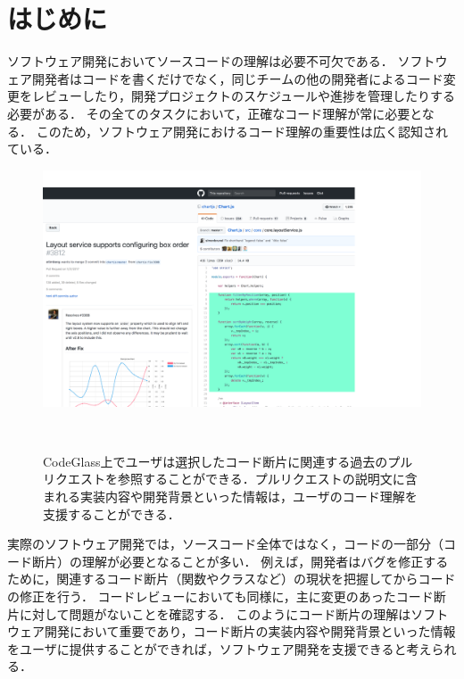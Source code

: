 \section{はじめに}



ソフトウェア開発においてソースコードの理解は必要不可欠である．
ソフトウェア開発者はコードを書くだけでなく，同じチームの他の開発者によるコード変更をレビューしたり，開発プロジェクトのスケジュールや進捗を管理したりする必要がある．
その全てのタスクにおいて，正確なコード理解が常に必要となる．
このため，ソフトウェア開発におけるコード理解の重要性は広く認知されている．

\begin{figure}[!b]
\centering
\includegraphics[width=1.2\columnwidth]{interface/top_image.png}
\caption{CodeGlass上でユーザは選択したコード断片に関連する過去のプルリクエストを参照することができる．プルリクエストの説明文に含まれる実装内容や開発背景といった情報は，ユーザのコード理解を支援することができる．}
~\label{fig:top}
\end{figure}





実際のソフトウェア開発では，ソースコード全体ではなく，コードの一部分（コード断片）の理解が必要となることが多い．
例えば，開発者はバグを修正するために，関連するコード断片（関数やクラスなど）の現状を把握してからコードの修正を行う．
コードレビューにおいても同様に，主に変更のあったコード断片に対して問題がないことを確認する．
このようにコード断片の理解はソフトウェア開発において重要であり，コード断片の実装内容や開発背景といった情報をユーザに提供することができれば，ソフトウェア開発を支援できると考えられる．


